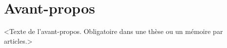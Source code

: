 \chapter*{Avant-propos}         %
\label{chap-avantpropos}        %

<Texte de l'avant-propos. Obligatoire dans une thèse ou un mémoire par
articles.>
